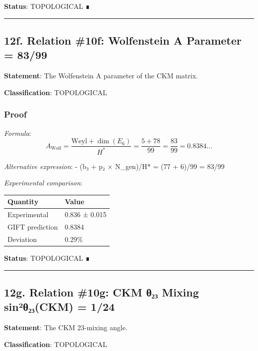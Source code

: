 \documentclass[11pt,a4paper]{article}
\begin{document}
\textbf{Status}: TOPOLOGICAL ∎

\begin{center}\rule{0.5\linewidth}{0.5pt}\end{center}

\subsection{12f. Relation \#10f: Wolfenstein A Parameter = 83/99}\label{f.-relation-10f-wolfenstein-a-parameter-8399}

\textbf{Statement}: The Wolfenstein A parameter of the CKM matrix.

\textbf{Classification}: TOPOLOGICAL

\subsubsection{Proof}\label{proof-13}

\emph{Formula}:
\[A_{\text{Wolf}} = \frac{\text{Weyl} + \dim(E_6)}{H^*} = \frac{5 + 78}{99} = \frac{83}{99} = 0.8384...\]

\emph{Alternative expression}:
- (b₃ + p₂ × N\_gen)/H* = (77 + 6)/99 = 83/99

\emph{Experimental comparison}:

{\def\LTcaptype{none} %
\begin{longtable}[]{@{}ll@{}}
\toprule\noalign{}
Quantity & Value \\
\midrule\noalign{}
\endhead
\bottomrule\noalign{}
\endlastfoot
Experimental & 0.836 ± 0.015 \\
GIFT prediction & 0.8384 \\
Deviation & 0.29\% \\
\end{longtable}
}

\textbf{Status}: TOPOLOGICAL ∎

\begin{center}\rule{0.5\linewidth}{0.5pt}\end{center}

\subsection{12g. Relation \#10g: CKM θ₂₃ Mixing sin²θ₂₃(CKM) = 1/24}\label{g.-relation-10g-ckm-ux3b8ux2082ux2083-mixing-sinuxb2ux3b8ux2082ux2083ckm-124}

\textbf{Statement}: The CKM 23-mixing angle.

\textbf{Classification}: TOPOLOGICAL
\end{document}

